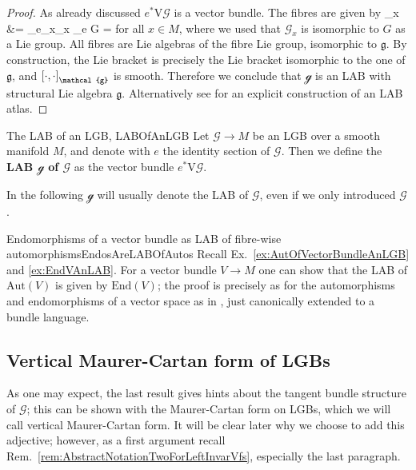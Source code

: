 \documentclass[a4paper,oneside,11pt,bibliography=totoc]{scrartcl}
\def\bas#1\eas{\begin{align*}#1\end{align*}}
\theoremstyle{plain}
\theoremstyle{remark}
\theoremstyle{definition}
\begin{document}
\begin{proof}
\leavevmode\newline
As already discussed $e^*\mathrm{V}\mathcal{G}$ is a vector bundle. The fibres are given by
\bas
\mathcal{g}_{x}
&=
_{e_x}_x
\cong
{}_{e} G
=
\eas
for all $x \in M$, where we used that $\mathcal{G}_x$ is isomorphic to $G$ as a Lie group. All fibres are Lie algebras of the fibre Lie group, isomorphic to $\mathfrak{g}$. By construction, the Lie bracket is precisely the Lie bracket isomorphic to the one of $\mathfrak{g}$, and $\mleft[ \cdot, \cdot \mright]_{\mathcal{g}}$ is smooth. Therefore we conclude that $\mathcal{g}$ is an LAB with structural Lie algebra $\mathfrak{g}$. Alternatively see \cite[\S 3.5, Ex.\ 3.5.12, page 126]{mackenzieGeneralTheory} for an explicit construction of an LAB atlas.
\end{proof}

\begin{definitions}{The LAB of an LGB, \newline\cite[\S 3.5, special situation of Def.\ 3.5.1, page 120]{mackenzieGeneralTheory}}{LABOfAnLGB}
Let $\mathcal{G} \to M$ be an LGB over a smooth manifold $M$, and denote with $e$ the identity section of $\mathcal{G}$. Then we define the \textbf{LAB $\mathcal{g}$ of $\mathcal{G}$} as the vector bundle $e^*\mathrm{V}\mathcal{G}$.
\end{definitions}

In the following $\mathcal{g}$ will usually denote the LAB of $\mathcal{G}$, even if we only introduced $\mathcal{G}$.

\begin{examples}{Endomorphisms of a vector bundle as LAB of fibre-wise automorphisms}{EndosAreLABOfAutos}
Recall Ex.\ \ref{ex:AutOfVectorBundleAnLGB} and \ref{ex:EndVAnLAB}. For a vector bundle $V \to M$ one can show that the LAB of $\mathrm{Aut}(V)$ is given by $\mathrm{End}(V)$; the proof is precisely as for the automorphisms and endomorphisms of a vector space as in \cite[\S 1.5.4, page 45ff.]{Hamilton}, just canonically extended to a bundle language. 
\end{examples}

\subsection{Vertical Maurer-Cartan form of LGBs}

As one may expect, the last result gives hints about the tangent bundle structure of $\mathcal{G}$; this can be shown with the Maurer-Cartan form on LGBs, which we will call vertical Maurer-Cartan form. It will be clear later why we choose to add this adjective; however, as a first argument recall Rem.\ \ref{rem:AbstractNotationTwoForLeftInvarVfs}, especially the last paragraph.
\end{document}

